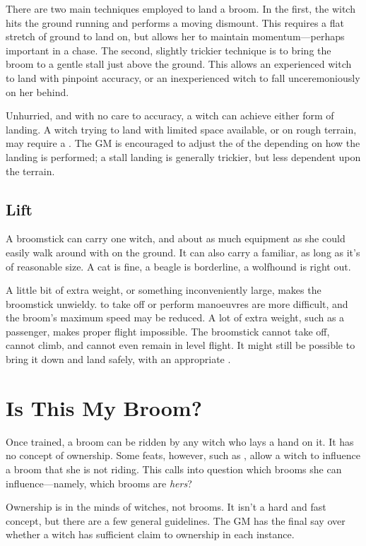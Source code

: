 There are two main techniques employed to land a broom.
In the first, the witch hits the ground running and performs a moving dismount.
This requires a flat stretch of ground to land on, but allows her to maintain momentum---perhaps important in a chase.
The second, slightly trickier technique is to bring the broom to a gentle stall just above the ground.
This allows an experienced witch to land with pinpoint accuracy, or an inexperienced witch to fall unceremoniously on her behind.

Unhurried, and with no care to accuracy, a witch can achieve either form of landing.
A witch trying to land with limited space available, or on rough terrain, may require a {\test}.
The GM is encouraged to adjust the {\tn} of the {\test} depending on how the landing is performed; a stall landing is generally trickier, but less dependent upon the terrain.

\subsection{Lift}

A broomstick can carry one witch, and about as much equipment as she could easily walk around with on the ground.
It can also carry a familiar, as long as it's of reasonable size.
A cat is fine, a beagle is borderline, a wolfhound is right out.

A little bit of extra weight, or something inconveniently large, makes the broomstick unwieldy.
\capital{\tests} to take off or perform manoeuvres are more difficult, and the broom's maximum speed may be reduced.
A lot of extra weight, such as a passenger, makes proper flight impossible.
The broomstick cannot take off, cannot climb, and cannot even remain in level flight.
It might still be possible to bring it down and land safely, with an appropriate {\test}.



\section{Is This My Broom?}

Once trained, a broom can be ridden by any witch who lays a hand on it.
It has no concept of ownership.
Some feats, however, such as , allow a witch to influence a broom that she is not riding.
This calls into question which brooms she can influence---namely, which brooms are \emph{hers}?

Ownership is in the minds of witches, not brooms.
It isn't a hard and fast concept, but there are a few general guidelines.
The GM has the final say over whether a witch has sufficient claim to ownership in each instance.

